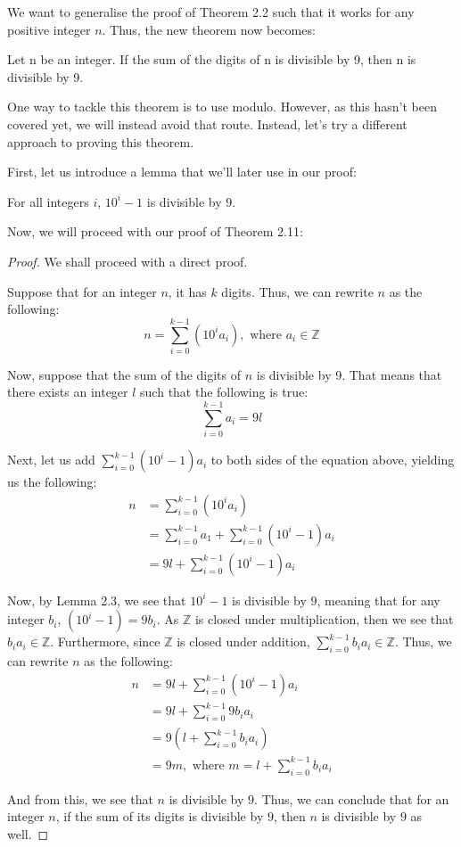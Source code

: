\documentclass[openany]{book}
\renewcommand\qedsymbol{$\blacksquare$}
\let\oldsum\sum
\renewcommand{\sum}[2]{\oldsum\limits_{#1}^{#2}}
\begin{document}
We want to generalise the proof of Theorem 2.2 such that it works for any positive integer $n$. Thus, the new theorem now becomes:
\begin{theorem}
	Let n be an integer. If the sum of the digits of n is divisible by 9, then n is divisible by 9.
\end{theorem}
One way to tackle this theorem is to use modulo. However, as this hasn't been covered yet, we will instead avoid that route. Instead, let's try a different approach to proving this theorem.

First, let us introduce a lemma that we'll later use in our proof:
\begin{lemma}
	For all integers $i$, $10^i-1$ is divisible by $9$.
\end{lemma}

Now, we will proceed with our proof of Theorem 2.11:
\begin{proof}\renewcommand{\qedsymbol}{$\blacksquare$}
	We shall proceed with a direct proof.

	Suppose that for an integer $n$, it has $k$ digits. Thus, we can rewrite $n$ as the following:
	\begin{equation*}
		n = \sum{i=0}{k-1}(10^ia_i), \text{ where } a_i\in\mathbb{Z}
	\end{equation*}
	
	Now, suppose that the sum of the digits of $n$ is divisible by 9. That means that there exists an integer $l$ such that the following is true:
	\begin{equation*}
		\sum{i=0}{k-1}a_i=9l
	\end{equation*}
	
	Next, let us add $\sum{i=0}{k-1}(10^i-1)a_i$ to both sides of the equation above, yielding us the following:
	\begin{align*}
		n &= \sum{i=0}{k-1}(10^ia_i) \\
		&= \sum{i=0}{k-1}a_1 + \sum{i=0}{k-1}(10^i-1)a_i \\
		&= 9l + \sum{i=0}{k-1}(10^i-1)a_i
	\end{align*}
	
	Now, by Lemma 2.3, we see that $10^i -1$ is divisible by $9$, meaning that for any integer $b_i$, $(10^i-1)=9b_i$. As $\mathbb{Z}$ is closed under multiplication, then we see that $b_ia_i\in\mathbb{Z}$. Furthermore, since $\mathbb{Z}$ is closed under addition, $\sum{i=0}{k-1}b_ia_i\in\mathbb{Z}$. Thus, we can rewrite $n$ as the following:
	\begin{align*}
		n &= 9l + \sum{i=0}{k-1}(10^i-1)a_i \\
		&= 9l + \sum{i=0}{k-1}9b_ia_i \\
		&= 9(l+\sum{i=0}{k-1}b_ia_i) \\
		&= 9m, \text{ where } m=l+\sum{i=0}{k-1}b_ia_i
	\end{align*}
	
	And from this, we see that $n$ is divisible by $9$. Thus, we can conclude that for an integer $n$, if the sum of its digits is divisible by $9$, then $n$ is divisible by $9$ as well.
\end{proof}
\end{document}
